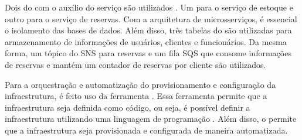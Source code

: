 Dois  do  com o auxílio do serviço  são utilizados \cite{postgreSql}. Um para o serviço de estoque e outro para o serviço de reservas. Com a arquitetura de microsserviços, é essencial o isolamento das bases de dados. Além disso, três tabelas do  são utilizadas para armazenamento de informações de usuários, clientes e funcionários. Da mesma forma, um tópico do SNS para reservas e um fila SQS que consome informações de reservas e mantém um contador de reservas por cliente são utilizados.

Para a orquestração e automatização do provisionamento e configuração da infraestrutura, é feito uso da ferramenta . Essa ferramenta permite que a infraestrutura seja definida como código, ou seja, é possível definir a infraestrutura utilizando uma linguagem de programação \cite{terraform}. Além disso, o  permite que a infraestrutura seja provisionada e configurada de maneira automatizada.
